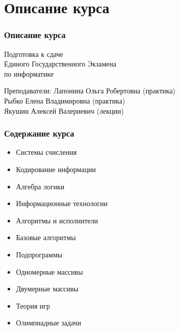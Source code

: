 \subtitle{Введение в предмет}
\frame[plain]
{\titlepage}	%

	\section{Описание курса}
	\begin{frame}
\frametitle{Описание курса}


\LARGE \begin{center}
Подготовка к сдаче \\Единого Государственного Экзамена\\ по информатике
\end{center}

\normalsize

\begin{block}{Преподаватели:}
Лапонина Ольга Робертовна (практика)\\
Рыбко Елена Владимировна (практика)\\
Якушин Алексей Валериевич (лекции)\\
\end{block}

\end{frame}

\begin{frame}
\frametitle{Содержание курса}


\begin{itemize}
\item Системы счисления
\item Кодирование информации
\item Алгебра логики
\item Информационные технологии
\item Алгоритмы и исполнители
\item Базовые алгоритмы
\item Подпрограммы
\item Одномерные массивы
\item Двумерные массивы
\item Теория игр
\item Олимпиадные задачи

\end{itemize}

\end{frame}

